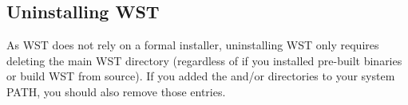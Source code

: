 \subsection{Uninstalling WST}

As WST does not rely on a formal installer, uninstalling WST only requires
deleting the main WST directory (regardless of if you installed
pre-built binaries or build WST from source). If you added the
 and/or  directories to your system
PATH, you should also remove those entries.

